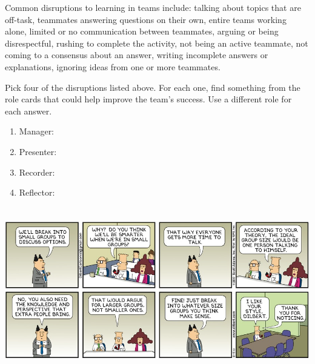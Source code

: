 

Common disruptions to learning in teams include: talking about topics that are off-task, teammates answering questions on their own, entire teams working alone, limited or no communication between teammates, arguing or being disrespectful, rushing to complete the activity, not being an active teammate, not coming to a consensus about an answer, writing incomplete answers or explanations, ignoring ideas from one or more teammates.




\Q Pick four of the disruptions listed above. For each one, find something from the role cards that could help improve the team's success. Use a different role for each answer.

\begin{enumerate}
\item Manager:
\vspace{2em}
\item Presenter:
\vspace{2em}
\item Recorder:
\vspace{2em}
\item Reflector:
\vspace{2em}
\end{enumerate}

\begin{center}
\includegraphics[height=2.85in]{Meta/disrupt1.png}
\end{center}
